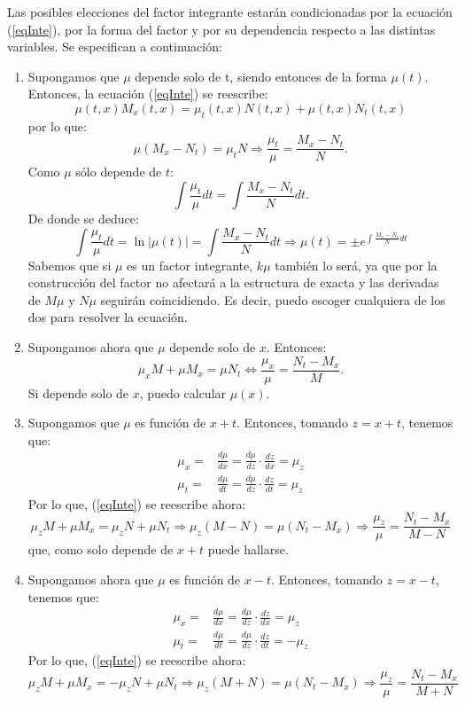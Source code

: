 \documentclass[11pt, a4paper,twoside]{article}
\theoremstyle{theorem-style}  %
\theoremstyle{definition-style}
\theoremstyle{example-style}
\providecommand{\abs}[1]{\left\lvert#1\right\rvert} %
\begin{document}
Las posibles elecciones del factor integrante estarán condicionadas por la ecuación (\ref{eqInte}), por la forma del factor y por su dependencia respecto a las distintas variables. Se especifican a continuación:
\begin{enumerate}
	\item Supongamos que $\mu$ depende solo de t, siendo entonces de la forma $\mu(t)$. Entonces, la ecuación (\ref{eqInte}) se reescribe:
	\[\mu(t, x)M_x(t, x) = \mu_t(t, x)N(t, x) + \mu(t, x)N_t(t, x)\]
	por lo que:
	\[\mu\left( M_x-N_t\right) = \mu_t N \Rightarrow \frac{\mu_t}{\mu} = \frac{M_x - N_t}{N}.\]
	Como $ \mu $ sólo depende de $t$:
	\[\int \frac{\mu_t}{\mu}dt = \int \frac{M_x - N_t}{N}dt.\]
	De donde se deduce:
	\[ \int \frac{\mu_t}{\mu}dt = \ln\abs{\mu(t)}= \int \frac{M_x - N_t}{N}dt\Rightarrow \mu(t)=\pm e^{\int \frac{M_x - N_t}{N}dt}\]
	Sabemos que si $ \mu $ es un factor integrante, $ k\mu $ también lo será, ya que por la construcción del factor no afectará a la estructura de exacta y las derivadas de $ M\mu $ y $ N\mu $ seguirán coincidiendo. Es decir, puedo escoger cualquiera de los dos para resolver la ecuación.
	\item Supongamos ahora que $\mu$ depende solo de $x$. Entonces:
	\[\mu_xM + \mu M_x = \mu N_t \Leftrightarrow \frac{\mu_x}{\mu} = \frac{N_t - M_x}{M}.\]
	Si depende solo de $x$, puedo calcular $\mu (x)$.
	\item  Supongamos que $\mu$ es función de $x+t$. Entonces, tomando $z=x+t$, tenemos que:
	\begin{align*}
		\mu_x = & \frac{d\mu}{dx} = \frac{d\mu}{dz} \cdot \frac{dz}{dx} = \mu_z \\
		\mu_t = & \frac{d\mu}{dt} = \frac{d\mu}{dz} \cdot \frac{dz}{dt} = \mu_z 
	\end{align*}
	Por lo que, (\ref{eqInte}) se reescribe ahora:
	\[\mu_z M + \mu M_x = \mu_z N + \mu N_t \Rightarrow \mu_z (M-N) = \mu (N_t - M_x) \Rightarrow \frac{\mu_z}{\mu} = \frac{N_t - M_x}{M - N}\]
	que, como solo depende de $x+t$ puede hallarse.
	\item Supongamos ahora que $\mu$ es función de $x-t$. Entonces, tomando $z=x-t$, tenemos que:
	\begin{align*}
	\mu_x = & \frac{d\mu}{dx} = \frac{d\mu}{dz} \cdot \frac{dz}{dx} = \mu_z \\
	\mu_t = & \frac{d\mu}{dt} = \frac{d\mu}{dz} \cdot \frac{dz}{dt} = -\mu_z 
	\end{align*}
	Por lo que, (\ref{eqInte}) se reescribe ahora:
	\[\mu_z M + \mu M_x = -\mu_z N + \mu N_t \Rightarrow \mu_z (M+N) = \mu (N_t - M_x) \Rightarrow \frac{\mu_z}{\mu} = \frac{N_t - M_x}{M + N}\]

\end{enumerate}
\end{document}
